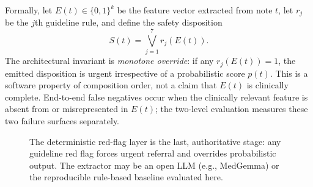 \documentclass[11pt]{article}
\begin{document}
Formally, let $E(t)\in\{0,1\}^{k}$ be the feature vector extracted from note $t$, let $r_j$ be the $j$th guideline rule, and define the safety disposition
\[
S(t)=\bigvee_{j=1}^{7} r_j(E(t)).
\]
The architectural invariant is \emph{monotone override}: if any $r_j(E(t))=1$, the emitted disposition is urgent irrespective of a probabilistic score $p(t)$. This is a software property of composition order, not a claim that $E(t)$ is clinically complete. End-to-end false negatives occur when the clinically relevant feature is absent from or misrepresented in $E(t)$; the two-level evaluation measures these two failure surfaces separately.

\begin{figure}[htbp]
\centering
{}
\caption{The deterministic red-flag layer is the last, authoritative stage: any guideline red flag forces urgent referral and overrides probabilistic output. The extractor may be an open LLM (e.g., MedGemma) or the reproducible rule-based baseline evaluated here.}
\label{fig:arch}
\end{figure}
\end{document}
